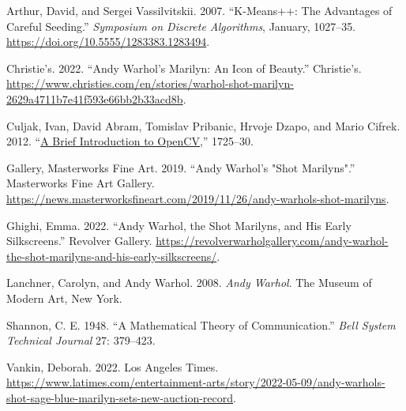 \documentclass{article}
\newlength{\cslhangindent}
\newlength{\cslentryspacingunit} %
\newenvironment{CSLReferences}[2] %
 {%
  \setlength{\parindent}{0pt}
  \ifodd #1
  \let\oldpar\par
  \def\par{\hangindent=\cslhangindent\oldpar}
  \fi
  \setlength{\parskip}{#2\cslentryspacingunit}
 }%
 {}
\begin{document}
\hypertarget{refs}{}
\begin{CSLReferences}{1}{0}
\leavevmode{}%
Arthur, David, and Sergei Vassilvitskii. 2007. {``K-Means++: The
Advantages of Careful Seeding.''} \emph{Symposium on Discrete
Algorithms}, January, 1027--35.
\url{https://doi.org/10.5555/1283383.1283494}.

\leavevmode{}%
Christie's. 2022. {``Andy Warhol's Marilyn: An Icon of Beauty.''}
Christie's.
\url{https://www.christies.com/en/stories/warhol-shot-marilyn-2629a4711b7e41f593e66bb2b33acd8b}.

\leavevmode{}%
Culjak, Ivan, David Abram, Tomislav Pribanic, Hrvoje Dzapo, and Mario
Cifrek. 2012. {``\href{}{A Brief Introduction to OpenCV},''} 1725--30.

\leavevmode{}%
Gallery, Masterworks Fine Art. 2019. {``Andy Warhol's "Shot
Marilyns".''} Masterworks Fine Art Gallery.
\url{https://news.masterworksfineart.com/2019/11/26/andy-warhols-shot-marilyns}.

\leavevmode{}%
Ghighi, Emma. 2022. {``Andy Warhol, the Shot Marilyns, and His Early
Silkscreens.''} Revolver Gallery.
\url{https://revolverwarholgallery.com/andy-warhol-the-shot-marilyns-and-his-early-silkscreens/}.

\leavevmode{}%
Lanchner, Carolyn, and Andy Warhol. 2008. \emph{Andy Warhol}. The Museum
of Modern Art, New York.

\leavevmode{}%
Shannon, C. E. 1948. {``A Mathematical Theory of Communication.''}
\emph{Bell System Technical Journal} 27: 379--423.

\leavevmode{}%
Vankin, Deborah. 2022. Los Angeles Times.
\url{https://www.latimes.com/entertainment-arts/story/2022-05-09/andy-warhols-shot-sage-blue-marilyn-sets-new-auction-record}.

\end{CSLReferences}



\end{document}
